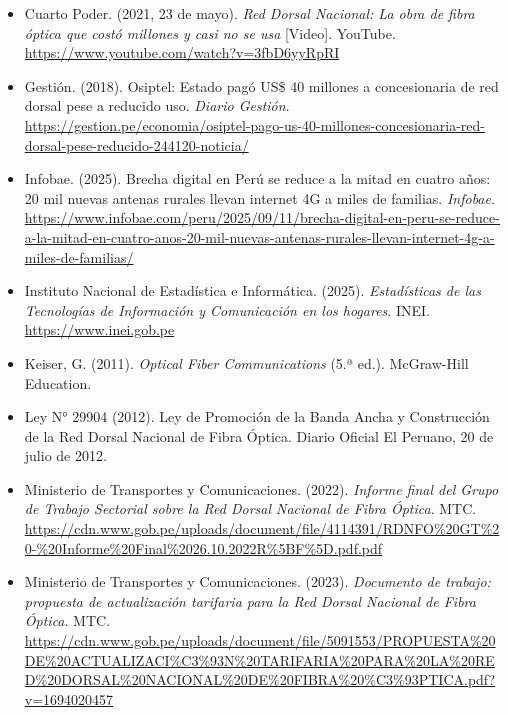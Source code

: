 \begin{itemize}[leftmargin=1.27cm, itemindent=-1.27cm, label={}, itemsep=12pt, parsep=0pt]
\item Cuarto Poder. (2021, 23 de mayo). \textit{Red Dorsal Nacional: La obra de fibra óptica que costó millones y casi no se usa} [Video]. YouTube.\\
\url{https://www.youtube.com/watch?v=3fbD6yyRpRI}

\item Gestión. (2018). Osiptel: Estado pagó US\$ 40 millones a concesionaria de red dorsal pese a reducido uso. \textit{Diario Gestión}.\\
\url{https://gestion.pe/economia/osiptel-pago-us-40-millones-concesionaria-red-dorsal-pese-reducido-244120-noticia/}

\item Infobae. (2025). Brecha digital en Perú se reduce a la mitad en cuatro años: 20 mil nuevas antenas rurales llevan internet 4G a miles de familias. \textit{Infobae}.\\
\url{https://www.infobae.com/peru/2025/09/11/brecha-digital-en-peru-se-reduce-a-la-mitad-en-cuatro-anos-20-mil-nuevas-antenas-rurales-llevan-internet-4g-a-miles-de-familias/}

\item Instituto Nacional de Estadística e Informática. (2025). \textit{Estadísticas de las Tecnologías de Información y Comunicación en los hogares}. INEI.\\
\url{https://www.inei.gob.pe}

\item Keiser, G. (2011). \textit{Optical Fiber Communications} (5.ª ed.). McGraw-Hill Education. \\

\item Ley N° 29904 (2012). Ley de Promoción de la Banda Ancha y Construcción de la Red Dorsal Nacional de Fibra Óptica. Diario Oficial El Peruano, 20 de julio de 2012.\\

\item Ministerio de Transportes y Comunicaciones. (2022). \textit{Informe final del Grupo de Trabajo Sectorial sobre la Red Dorsal Nacional de Fibra Óptica}. MTC.\\
\url{https://cdn.www.gob.pe/uploads/document/file/4114391/RDNFO%20GT%20-%20Informe%20Final%2026.10.2022R%5BF%5D.pdf.pdf}

\item Ministerio de Transportes y Comunicaciones. (2023). \textit{Documento de trabajo: propuesta de actualización tarifaria para la Red Dorsal Nacional de Fibra Óptica}. MTC.\\
\url{https://cdn.www.gob.pe/uploads/document/file/5091553/PROPUESTA%20DE%20ACTUALIZACI%C3%93N%20TARIFARIA%20PARA%20LA%20RED%20DORSAL%20NACIONAL%20DE%20FIBRA%20%C3%93PTICA.pdf?v=1694020457}


\end{itemize}
